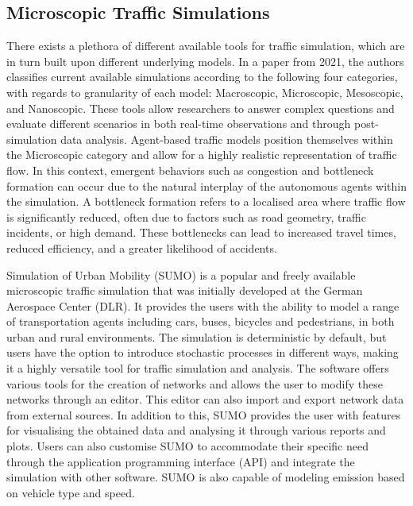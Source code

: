     \subsection{Microscopic Traffic Simulations}\label{traffic-simulations}
        There exists a plethora of different available tools for traffic simulation, which are in turn built upon different underlying models. In a paper from 2021\cite{NGUYEN2021100486}, the authors classifies current available simulations according to the following four categories, with regards to granularity of each model: Macroscopic, Microscopic, Mesoscopic, and Nanoscopic. These tools allow researchers to answer complex questions and evaluate different scenarios in both real-time observations and through post-simulation data analysis. Agent-based traffic models position themselves within the Microscopic category and allow for a highly realistic representation of traffic flow. In this context, emergent behaviors such as congestion and bottleneck formation can occur due to the natural interplay of the autonomous agents within the simulation. A bottleneck formation refers to a localised area where traffic flow is significantly reduced, often due to factors such as road geometry, traffic incidents, or high demand. These bottlenecks can lead to increased travel times, reduced efficiency, and a greater likelihood of accidents\cite{ZENG2021125918bottleneck}.

        Simulation of Urban Mobility (SUMO)\cite{sumo-paper-2012}\cite{sumo-website} is a popular and freely available microscopic traffic simulation that was initially developed at the German Aerospace Center (DLR). It provides the users with the ability to model a range of transportation agents including cars, buses, bicycles and pedestrians, in both urban and rural environments. The simulation is deterministic by default, but users have the option to introduce stochastic processes in different ways, making it a highly versatile tool for traffic simulation and analysis. The software offers various tools for the creation of networks and allows the user to modify these networks through an editor. This editor can also import and export network data from external sources. In addition to this, SUMO provides the user with features for visualising the obtained data and analysing it through various reports and plots. Users can also customise SUMO to accommodate their specific need through the application programming interface (API) and integrate the simulation with other software. SUMO is also capable of modeling emission based on vehicle type and speed.

